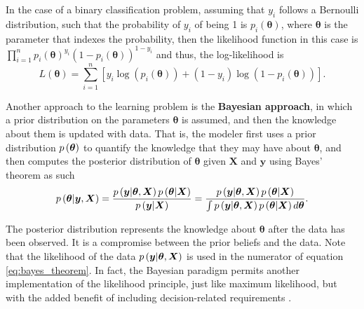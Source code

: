 
In the case of a binary classification problem, assuming that $y_i$ follows a Bernoulli distribution, such that the probability of $y_i$ of being 1 is $p_i(\boldsymbol{\theta})$, where $\boldsymbol{\theta}$ is the parameter that indexes the probability, then the likelihood function in this case is $\prod_{i = 1}^n  p_i(\boldsymbol{\theta})^{y_i}\left(1 - p_i(\boldsymbol{\theta}) \right)^{1 - y_i}$ and thus, the log-likelihood is
\begin{equation}
  L(\boldsymbol{\theta}) = \sum_{i = 1}^n \left[ y_i \log\left( p_i(\boldsymbol{\theta}) \right) + (1 - y_i) \log \left( 1 - p_i(\boldsymbol{\theta}) \right) \right].
\end{equation}

Another approach to the learning problem is the \textbf{Bayesian approach}, in which a prior distribution on the parameters $\boldsymbol{\theta}$ is assumed, and then the knowledge about them is updated with data. That is, the modeler first uses a prior distribution $p\left( \boldsymbol{\theta} \right)$ to quantify the knowledge that they may have about $\boldsymbol{\theta}$, and then computes the posterior distribution of $\boldsymbol{\theta}$ given $\boldsymbol{X}$ and $\boldsymbol{y}$ using Bayes' theorem as such
\begin{equation}
  \label{eq:bayes_theorem}
  p\left( \boldsymbol{\theta} | \boldsymbol{y}, \boldsymbol{X}  \right) =
  \frac{p\left( \boldsymbol{y} | \boldsymbol{\theta}, \boldsymbol{X} \right) p\left( \boldsymbol{\theta} | \boldsymbol{X} \right)}{p\left( \boldsymbol{y} | \boldsymbol{X} \right)} =
  \frac{p\left( \boldsymbol{y} | \boldsymbol{\theta}, \boldsymbol{X} \right) p\left( \boldsymbol{\theta} | \boldsymbol{X} \right)}{\int p\left( \boldsymbol{y} | \boldsymbol{\theta}, \boldsymbol{X} \right) p\left( \boldsymbol{\theta} | \boldsymbol{X} \right) d\boldsymbol{\theta}}.
\end{equation}

The posterior distribution represents the knowledge about $\boldsymbol{\theta}$ after the data has been observed. It is a compromise between the prior beliefs and the data. Note that the likelihood of the data $p\left( \boldsymbol{y} | \boldsymbol{\theta}, \boldsymbol{X} \right)$ is used in the numerator of equation \eqref{eq:bayes_theorem}. In fact, the Bayesian paradigm permits another implementation of the likelihood principle, just like maximum likelihood, but with the added benefit of including decision-related requirements \cite{robert2007bayesian}.

